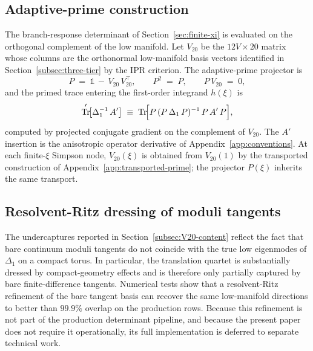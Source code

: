 \documentclass[a4paper,11pt]{article}
\theoremstyle{definition}
\newcommand{\Tr}{\mathop{\rm Tr}}
\begin{document}
\subsection{Adaptive-prime construction}
\label{subsec:adaptive-prime}

The branch-response determinant of Section~\ref{sec:finite-xi} is
evaluated on the orthogonal complement of the low manifold. Let
$V_{20}$ be the $12V \!\times\! 20$ matrix whose columns are the
orthonormal low-manifold basis vectors identified in
Section~\ref{subsec:three-tier} by the IPR criterion. The adaptive-prime
projector is
\begin{equation}
P \;=\; \mathbb{1} \,-\, V_{20}\,V_{20}^{\!\top},
\qquad
P^2 \;=\; P,\qquad
P\,V_{20} \;=\; 0,
\label{eq:adaptive-prime-projector}
\end{equation}
and the primed trace entering the first-order integrand $h(\xi)$ is
\begin{equation}
\Tr'\!\bigl[\Delta_1^{-1}\,A'\bigr]
\;\equiv\;
\Tr\!\Bigl[P\,(P\,\Delta_1\,P)^{-1}\,P\,A'\,P\Bigr],
\label{eq:primed-trace}
\end{equation}
computed by projected conjugate gradient on the complement of
$V_{20}$. The $A'$ insertion is the anisotropic operator derivative
of Appendix~\ref{app:conventions}. At each finite-$\xi$ Simpson
node, $V_{20}(\xi)$ is obtained from $V_{20}(1)$ by the transported
construction of Appendix~\ref{app:transported-prime}; the projector
$P(\xi)$ inherits the same transport.

\subsection{Resolvent-Ritz dressing of moduli tangents}
\label{subsec:resolvent-Ritz}

The undercaptures reported in Section~\ref{subsec:V20-content} reflect the
fact that bare continuum moduli tangents do not coincide with the
true low eigenmodes of $\Delta_1$ on a compact torus. In particular,
the translation quartet is substantially dressed by compact-geometry
effects and is therefore only partially captured by bare
finite-difference tangents. Numerical tests show that a
resolvent-Ritz refinement of the bare tangent basis can recover the
same low-manifold directions to better than $99.9\%$ overlap on the
production rows. Because this refinement is not part of the
production determinant pipeline, and because the present paper does
not require it operationally, its full implementation is deferred to
separate technical work.
\end{document}
